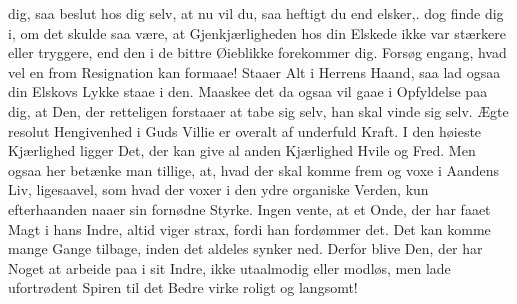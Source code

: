 \documentclass[12pt,a4paper]{book}
\newcommand{\apage}[1]{\marginnote{\footnotesize\textit{[#1]}}}
\begin{document}
dig, saa beslut hos dig selv, at nu \apage{128} vil du, saa heftigt du end elsker,.
dog finde dig i, om det skulde saa være, at Gjenkjærligheden hos din
Elskede ikke var stærkere eller tryggere, end den i de bittre Øieblikke
forekommer dig. Forsøg engang, hvad vel en from Resignation kan formaae!
Staaer Alt i Herrens Haand, saa lad ogsaa din Elskovs Lykke staae i den.
Maaskee det da ogsaa vil gaae i Opfyldelse paa dig, at Den, der
retteligen forstaaer at tabe sig selv, han skal vinde sig selv. Ægte
resolut Hengivenhed i Guds Villie er overalt af underfuld Kraft. I den
høieste Kjærlighed ligger Det, der kan give al anden Kjærlighed Hvile og
Fred. Men ogsaa her betænke man tillige, at, hvad der skal komme frem og
voxe i Aandens Liv, ligesaavel, som hvad der voxer i den ydre organiske
Verden, kun efterhaanden naaer sin fornødne Styrke. Ingen vente, at et
Onde, der har faaet Magt i hans Indre, altid viger strax, fordi han
fordømmer det. Det kan komme mange Gange tilbage, inden det aldeles
synker ned. Derfor blive Den, der har Noget at arbeide paa i sit Indre,
ikke utaalmodig eller modløs, men lade ufortrødent Spiren til det Bedre
virke roligt og langsomt!
\end{document}

